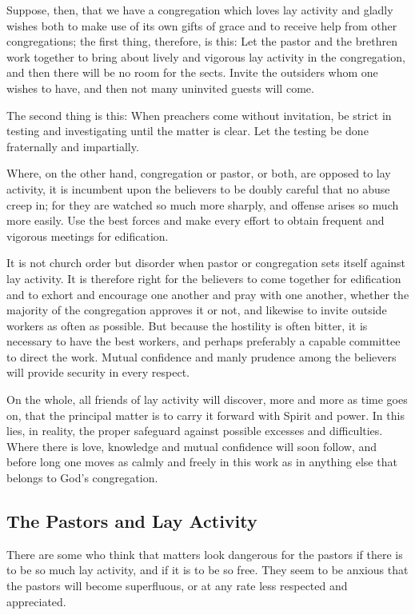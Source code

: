 Suppose, then, that we have a congregation which loves lay activity and gladly wishes both to make use of its own gifts of grace and to receive help from other congregations; the first thing, therefore, is this: Let the pastor and the brethren work together to bring about lively and vigorous lay activity in the congregation, and then there will be no room for the sects. Invite the outsiders whom one wishes to have, and then not many uninvited guests will come.

The second thing is this: When preachers come without invitation, be strict in testing and investigating until the matter is clear. Let the testing be done fraternally and impartially.

Where, on the other hand, congregation or pastor, or both, are opposed to lay activity, it is incumbent upon the believers to be doubly careful that no abuse creep in; for they are watched so much more sharply, and offense arises so much more easily. Use the best forces and make every effort to obtain frequent and vigorous meetings for edification.

It is not church order but disorder when pastor or congregation sets itself against lay activity. It is therefore right for the believers to come together for edification and to exhort and encourage one another and pray with one another, whether the majority of the congregation approves it or not, and likewise to invite outside workers as often as possible. But because the hostility is often bitter, it is necessary to have the best workers, and perhaps preferably a capable committee to direct the work. Mutual confidence and manly prudence among the believers will provide security in every respect.

On the whole, all friends of lay activity will discover, more and more as time goes on, that the principal matter is to carry it forward with Spirit and power. In this lies, in reality, the proper safeguard against possible excesses and difficulties. Where there is love, knowledge and mutual confidence will soon follow, and before long one moves as calmly and freely in this work as in anything else that belongs to God’s congregation.

\subsection{The Pastors and Lay Activity}

There are some who think that matters look dangerous for the pastors if there is to be so much lay activity, and if it is to be so free. They seem to be anxious that the pastors will become superfluous, or at any rate less respected and appreciated.

